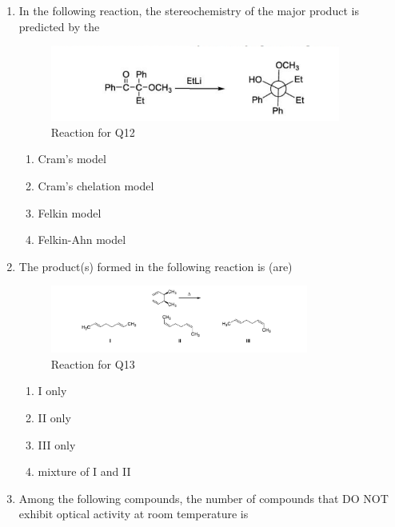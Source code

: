 \documentclass[journal,12pt,onecolumn]{IEEEtran}
\theoremstyle{remark}
\begin{document}
\begin{enumerate}
\item In the following reaction, the stereochemistry of the major product is predicted by the \hfill{}

\begin{figure}[h!]
    \centering
    \includegraphics[width=0.9\textwidth]{figs/image6.png}
    \caption{Reaction for Q12}
    \label{fig:q12reaction}
\end{figure}

\begin{multicols}{2}
\begin{enumerate}
    \item Cram's model
    \item Cram's chelation model
    \item Felkin model
    \item Felkin-Ahn model
\end{enumerate}
\end{multicols}

\item The product(s) formed in the following reaction is (are) \hfill{}

\begin{figure}[h!]
    \centering
    \includegraphics[width=0.8\textwidth]{figs/image7.png}
    \caption{Reaction for Q13}
    \label{fig:q13reaction}
\end{figure}

\begin{multicols}{2}
\begin{enumerate}
    \item I only
    \item II only
    \item III only
    \item mixture of I and II
\end{enumerate}
\end{multicols}
\newpage
\item Among the following compounds, the number of compounds that DO NOT exhibit optical activity at room temperature is \hfill{}


\end{enumerate}
\end{document}
